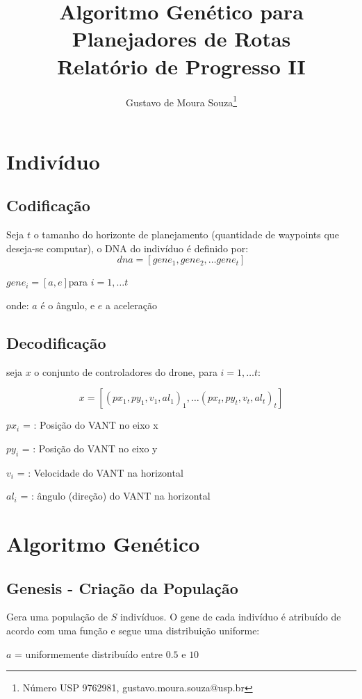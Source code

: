 \documentclass{article}
\begin{document}
\title{Algoritmo Genético para Planejadores de Rotas \\
	\large Relatório de Progresso II}
\author{Gustavo de Moura Souza\thanks{Número USP 9762981, gustavo.moura.souza@usp.br}}

\maketitle

\section{Indivíduo}
\subsection{Codificação}
Seja \(t\) o tamanho do horizonte de planejamento (quantidade de waypoints que deseja-se computar), o DNA do indivíduo é definido por:
\[dna = [ gene_1, gene_2, … gene_t ] \]

\(gene_i = [ a, e ]\)\hfill para \(i = 1, … t\)


onde: \(a\) é o ângulo, e \(e\) a aceleração


\subsection{Decodificação}
seja \(x\) o conjunto de controladores do drone, para \(i = 1, … t\):

\[x = [ (px_1, py_1, v_1, al_1)_1, … (px_t, py_t, v_t, al_t)_t]\]


\(px_i\) = : Posição do VANT no eixo x
 
\(py_i\) = : Posição do VANT no eixo y

\(v_i\)  = : Velocidade do VANT na horizontal

\(al_i\) = : ângulo (direção) do VANT na horizontal



\section{Algoritmo Genético}
\subsection{Genesis - Criação da População}
Gera uma população de \(S\) indivíduos. O gene de cada indivíduo é atribuído de acordo com uma função e segue uma distribuição uniforme:

\(a\) = uniformemente distribuído entre \(0.5\) e \(10\)
\end{document}
